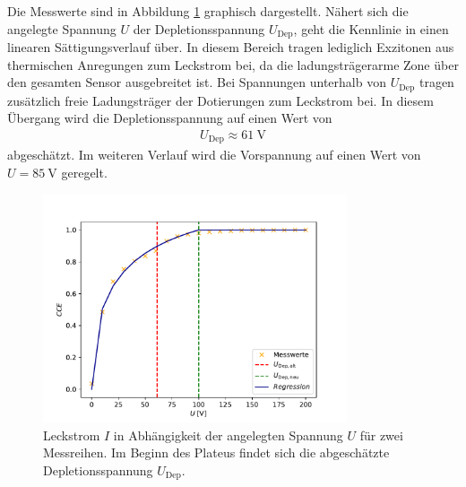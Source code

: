   Die Messwerte sind in Abbildung \ref{fig:UI-Kennlinie} graphisch dargestellt.
  Nähert sich die angelegte Spannung $U$ der Depletionsspannung $U_\mathrm{Dep}$, geht die Kennlinie in einen linearen Sättigungsverlauf über. In diesem Bereich tragen lediglich Exzitonen aus thermischen Anregungen zum Leckstrom bei, da die ladungsträgerarme Zone über den gesamten Sensor ausgebreitet ist. Bei Spannungen unterhalb von $U_\mathrm{Dep}$ tragen zusätzlich freie Ladungsträger der Dotierungen zum Leckstrom bei. In diesem Übergang wird die Depletionsspannung auf einen Wert von
  \begin{align*}
    U_\mathrm{Dep} \approx \SI{61}{\volt}
  \end{align*}
  abgeschätzt. Im weiteren Verlauf wird die Vorspannung auf einen Wert von $U=\SI{85}{\volt}$ geregelt.

\begin{figure}
  \centering
  \includegraphics[width=0.8\textwidth]{plots/Kennlinie_Laser.pdf}
  \caption{Leckstrom $I$ in Abhängigkeit der angelegten Spannung $U$ für zwei Messreihen. Im Beginn des Plateus findet sich die abgeschätzte Depletionsspannung $U_\mathrm{Dep}$.}
  \label{fig:UI-Kennlinie}
\end{figure}
\FloatBarrier

